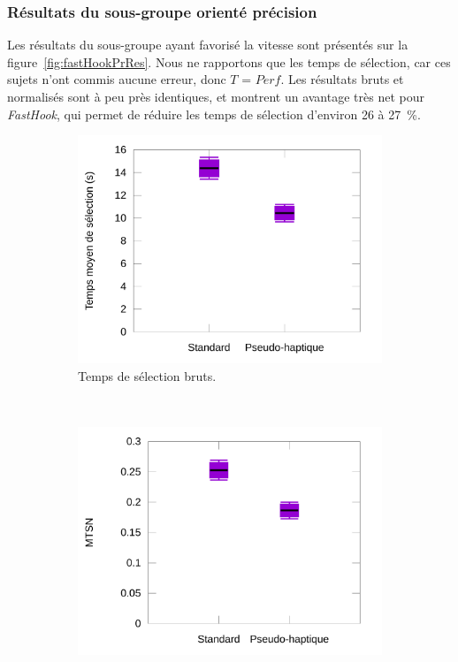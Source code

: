 	\subsubsection{Résultats du sous-groupe orienté précision}
	Les résultats du sous-groupe ayant favorisé la vitesse sont présentés sur la figure~\ref{fig:fastHookPrRes}. Nous ne rapportons que les temps de sélection, car ces sujets n'ont commis aucune erreur, donc $T$ = $Perf$. Les résultats bruts et normalisés sont à peu près identiques, et montrent un avantage très net pour \emph{FastHook}, qui permet de réduire les temps de sélection d'environ 26 à 27~\%{}.
	
	\begin{figure}[htbp]
		\begin{subfigure}[t]{0.49\textwidth}
			\centering
			\includegraphics[width=\textwidth]{figures/ch5/phPrRawTimes}
			\caption{Temps de sélection bruts.}
			\label{fig:phPrRawTimes}
		\end{subfigure}
		~
		\begin{subfigure}[t]{0.49\textwidth}
			\centering
			\includegraphics[width=\textwidth]{figures/ch5/phPrNormTimes}

\end{subfigure}
\end{figure}
